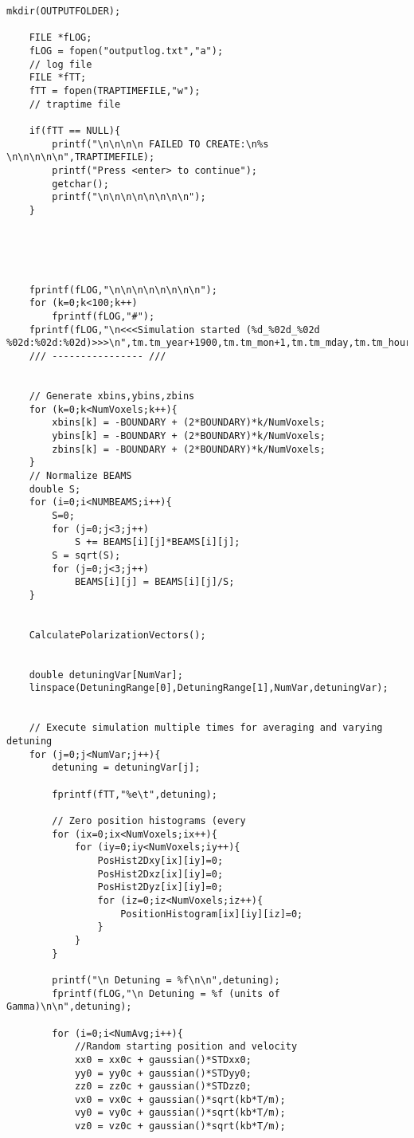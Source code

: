 \begin{lstlisting}[style=CStyle]
    mkdir(OUTPUTFOLDER);

    FILE *fLOG;
    fLOG = fopen("outputlog.txt","a");
    // log file
    FILE *fTT;
    fTT = fopen(TRAPTIMEFILE,"w");
    // traptime file

    if(fTT == NULL){
        printf("\n\n\n\n FAILED TO CREATE:\n%s \n\n\n\n\n",TRAPTIMEFILE);
        printf("Press <enter> to continue");
        getchar();
        printf("\n\n\n\n\n\n\n\n");
    }





    fprintf(fLOG,"\n\n\n\n\n\n\n\n");
    for (k=0;k<100;k++)
        fprintf(fLOG,"#");
    fprintf(fLOG,"\n<<<Simulation started (%d_%02d_%02d %02d:%02d:%02d)>>>\n",tm.tm_year+1900,tm.tm_mon+1,tm.tm_mday,tm.tm_hour,tm.tm_min,tm.tm_sec);
    /// ---------------- ///


    // Generate xbins,ybins,zbins
    for (k=0;k<NumVoxels;k++){
        xbins[k] = -BOUNDARY + (2*BOUNDARY)*k/NumVoxels;
        ybins[k] = -BOUNDARY + (2*BOUNDARY)*k/NumVoxels;
        zbins[k] = -BOUNDARY + (2*BOUNDARY)*k/NumVoxels;
    }
    // Normalize BEAMS
    double S;
    for (i=0;i<NUMBEAMS;i++){
        S=0;
        for (j=0;j<3;j++)
            S += BEAMS[i][j]*BEAMS[i][j];
        S = sqrt(S);
        for (j=0;j<3;j++)
            BEAMS[i][j] = BEAMS[i][j]/S;
    }


    CalculatePolarizationVectors();


    double detuningVar[NumVar];
    linspace(DetuningRange[0],DetuningRange[1],NumVar,detuningVar);


    // Execute simulation multiple times for averaging and varying detuning
    for (j=0;j<NumVar;j++){
        detuning = detuningVar[j];

        fprintf(fTT,"%e\t",detuning);

        // Zero position histograms (every
        for (ix=0;ix<NumVoxels;ix++){
            for (iy=0;iy<NumVoxels;iy++){
                PosHist2Dxy[ix][iy]=0;
                PosHist2Dxz[ix][iy]=0;
                PosHist2Dyz[ix][iy]=0;
                for (iz=0;iz<NumVoxels;iz++){
                    PositionHistogram[ix][iy][iz]=0;
                }
            }
        }

        printf("\n Detuning = %f\n\n",detuning);
        fprintf(fLOG,"\n Detuning = %f (units of Gamma)\n\n",detuning);

        for (i=0;i<NumAvg;i++){
            //Random starting position and velocity
            xx0 = xx0c + gaussian()*STDxx0;
            yy0 = yy0c + gaussian()*STDyy0;
            zz0 = zz0c + gaussian()*STDzz0;
            vx0 = vx0c + gaussian()*sqrt(kb*T/m);
            vy0 = vy0c + gaussian()*sqrt(kb*T/m);
            vz0 = vz0c + gaussian()*sqrt(kb*T/m);



\end{lstlisting}
